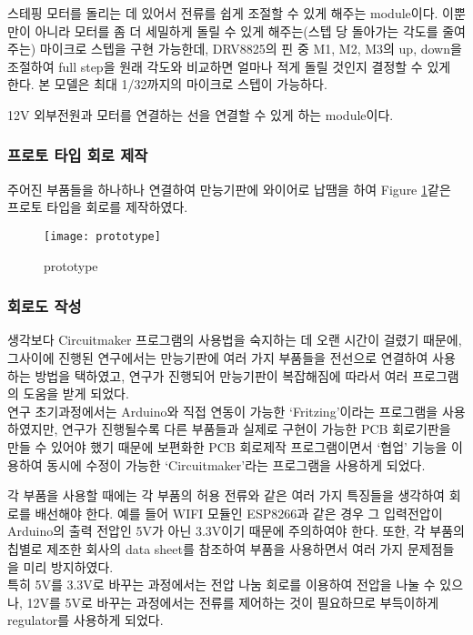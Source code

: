\begin{description}[font=$\bullet$~\normalfont\scshape\color{red!50!black}]
	\item [TMC2100 (DRV8825)] 스테핑 모터를 돌리는 데 있어서 전류를 쉽게 조절할 수 있게 해주는 module이다. 이뿐만이 아니라 모터를 좀 더 세밀하게 돌릴 수 있게 해주는(스텝 당 돌아가는 각도를 줄여주는) 마이크로 스텝을 구현 가능한데, DRV8825의 핀 중 M1, M2, M3의 up, down을 조절하여 full step을 원래 각도와 비교하면 얼마나 적게 돌릴 것인지 결정할 수 있게 한다. 본 모델은 최대 1/32까지의 마이크로 스텝이 가능하다.
	\item [TE Connectivity/AMP 5525258-3 및 Wurth Elektronik 694106301002] 12V 외부전원과 모터를 연결하는 선을 연결할 수 있게 하는 module이다.
\end{description}

\subsubsection{프로토 타입 회로 제작}

주어진 부품들을 하나하나 연결하여 만능기판에 와이어로 납땜을 하여 Figure \ref{fig:prototype}\과 같은 프로토 타입을 회로를 제작하였다. 

\begin{figure}[h]
	\begin{center}
		\texttt{[image: prototype]} 
		\caption{prototype}
		\label{fig:prototype}
	\end{center}
\end{figure}


\subsubsection{회로도 작성}


생각보다 Circuitmaker 프로그램의 사용법을 숙지하는 데 오랜 시간이 걸렸기 때문에, 그사이에 진행된 연구에서는 만능기판에 여러 가지 부품들을 전선으로 연결하여 사용하는 방법을 택하였고, 연구가 진행되어 만능기판이 복잡해짐에 따라서 여러 프로그램의 도움을 받게 되었다.\\

연구 초기과정에서는 Arduino와 직접 연동이 가능한 ‘Fritzing’이라는 프로그램을 사용하였지만, 연구가 진행될수록 다른 부품들과 실제로 구현이 가능한 PCB 회로기판을 만들 수 있어야 했기 때문에 보편화한 PCB 회로제작 프로그램이면서 ‘협업’ 기능을 이용하여 동시에 수정이 가능한 ‘Circuitmaker’라는 프로그램을 사용하게 되었다.

각 부품을 사용할 때에는 각 부품의 허용 전류와 같은 여러 가지 특징들을 생각하여 회로를 배선해야 한다. 예를 들어 WIFI 모듈인 ESP8266과 같은 경우 그 입력전압이 Arduino의 출력 전압인 5V가 아닌 3.3V이기 때문에 주의하여야 한다. 또한, 각 부품의 칩별로 제조한 회사의 data sheet를 참조하여 부품을 사용하면서 여러 가지 문제점들을 미리 방지하였다.\\
특히 5V를 3.3V로 바꾸는 과정에서는 전압 나눔 회로를 이용하여 전압을 나눌 수 있으나, 12V를 5V로 바꾸는 과정에서는 전류를 제어하는 것이 필요하므로 부득이하게 regulator를 사용하게 되었다.


